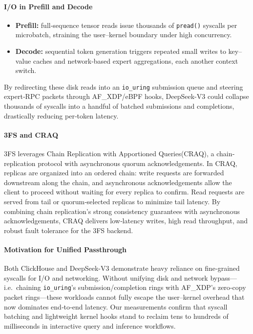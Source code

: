 \documentclass[sigconf,10pt]{acmart}
\begin{document}
\paragraph{I/O in Prefill and Decode}  
\begin{itemize}[itemsep=0pt]
  \item \textbf{Prefill:} full‐sequence tensor reads issue thousands of \texttt{pread()} syscalls per microbatch, straining the user–kernel boundary under high concurrency.
  \item \textbf{Decode:} sequential token generation triggers repeated small writes to key–value caches and network‐based expert aggregations, each another context switch.
\end{itemize}  
By redirecting these disk reads into an \texttt{io\_uring} submission queue and steering expert‐RPC packets through AF\_XDP/eBPF hooks, DeepSeek-V3 could collapse thousands of syscalls into a handful of batched submissions and completions, drastically reducing per‐token latency.

\paragraph{3FS and CRAQ}  
3FS leverages Chain Replication with Apportioned Queries(CRAQ)\cite{xu2024ionia,zhu2025intro}, a chain‐replication protocol with asynchronous quorum acknowledgements.  In CRAQ, replicas are organized into an ordered chain: write requests are forwarded downstream along the chain, and asynchronous acknowledgements allow the client to proceed without waiting for every replica to confirm.  Read requests are served from tail or quorum‐selected replicas to minimize tail latency.  By combining chain replication’s strong consistency guarantees with asynchronous acknowledgements, CRAQ delivers low‐latency writes, high read throughput, and robust fault tolerance for the 3FS backend.

\paragraph{Motivation for Unified Passthrough}  
Both ClickHouse and DeepSeek-V3 demonstrate heavy reliance on fine‐grained syscalls for I/O and networking.  Without unifying disk and network bypass—i.e.\ chaining \texttt{io\_uring}’s submission/completion rings with AF\_XDP’s zero‐copy packet rings—these workloads cannot fully escape the user–kernel overhead that now dominates end‐to‐end latency.  Our measurements confirm that syscall batching and lightweight kernel hooks stand to reclaim tens to hundreds of milliseconds in interactive query and inference workflows.
\end{document}
